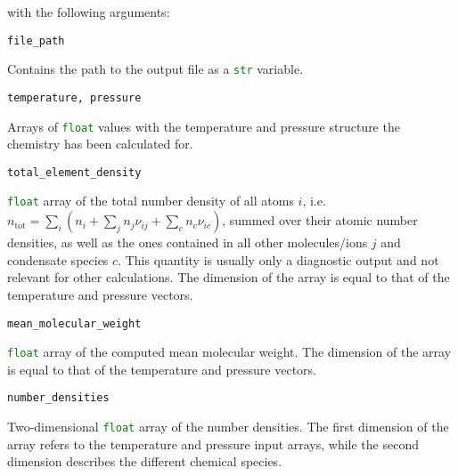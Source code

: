 \documentclass[numbers=noenddot]{aux/fcmanual}
\begin{document}
\bigbreak

with the following arguments:

\bigbreak

\lstinline[language=Python]!file_path!
\begin{addmargin}[25pt]{0pt}
	Contains the path to the output file as a \lstinline[language=Python]!str! variable.
\end{addmargin}


\bigbreak

\lstinline[language=Python]!temperature, pressure!
\begin{addmargin}[25pt]{0pt}
	Arrays of \lstinline[language=Python]!float! values with the temperature and pressure structure the chemistry has been calculated for.
\end{addmargin}

\bigbreak

\lstinline[language=Python]!total_element_density!
\begin{addmargin}[25pt]{0pt}
	\lstinline[language=Python]!float! array of the total number density of all atoms $i$, i.e. $n_\mathrm{tot} = \sum_i \left( n_i + \sum_j n_j \nu_{ij} + \sum_c n_c \nu_{ic}\right)$, summed over their atomic number densities, as well as the ones contained in all other molecules/ions $j$ and condensate species $c$. This quantity is usually only a diagnostic output and not relevant for other calculations. The dimension of the array is equal to that of the temperature and pressure vectors.
\end{addmargin}

\bigbreak

\lstinline[language=Python]!mean_molecular_weight!
\begin{addmargin}[25pt]{0pt}
	\lstinline[language=Python]!float! array of the computed mean molecular weight. The dimension of the array is equal to that of the temperature and pressure vectors.
\end{addmargin}


\bigbreak

\lstinline[language=Python]!number_densities!
\begin{addmargin}[25pt]{0pt}
	Two-dimensional \lstinline[language=Python]!float! array of the number densities. The first dimension of the array refers to the temperature and pressure input arrays, while the second dimension describes the different chemical species.
\end{addmargin}


\bigbreak
\end{document}
